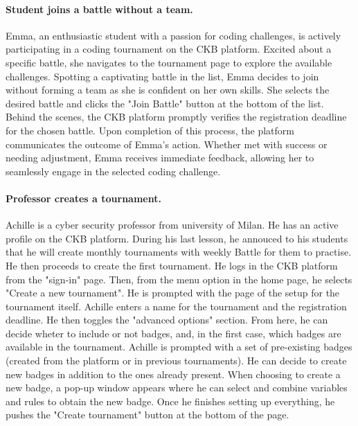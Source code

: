 \paragraph*{Student joins a battle without a team.}
Emma, an enthusiastic student with a passion for coding challenges, is actively participating in a coding tournament on the CKB platform. 
Excited about a specific battle, she navigates to the tournament page to explore the available challenges.
Spotting a captivating battle in the list, Emma decides to join without forming a team as she is confident on her own skills. 
She selects the desired battle and clicks the "Join Battle" button at the bottom of the list.
Behind the scenes, the CKB platform promptly verifies the registration deadline for the chosen battle. 
Upon completion of this process, the platform communicates the outcome of Emma's action. 
Whether met with success or needing adjustment, Emma receives immediate feedback, allowing her to seamlessly engage in the selected coding challenge.


\paragraph{Professor creates a tournament.}
Achille is a cyber security professor from university of Milan. He has an active profile on the CKB platform. 
During his last lesson, he annouced to his students that he will create monthly tournaments with weekly Battle for them to practise. 
He then proceeds to create the first tournament. He logs in the CKB platform from the "sign-in" page. 
Then, from the menu option in the home page, he selects "Create a new tournament". He is prompted with the page of the setup for the tournament itself. 
Achille enters a name for the tournament and the registration deadline. He then toggles the "advanced options" section. 
From here, he can decide wheter to include or not badges, and, in the first case, which badges are available in the tournament. 
Achille is prompted with a set of pre-existing badges (created from the platform or in previous tournaments). He can decide to 
create new badges in addition to the ones already present. When choosing to create a new badge, a pop-up window appears where he can select and combine 
variables and rules to obtain the new badge. Once he finishes setting up everything, he pushes the "Create tournament" button at the bottom of the page. 

